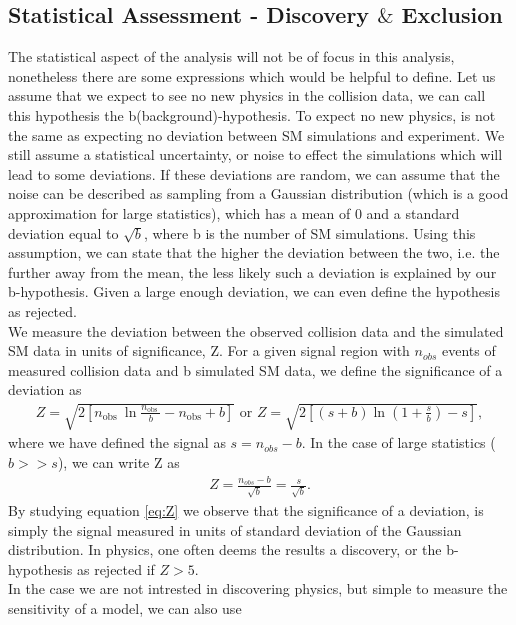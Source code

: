 \subsection{Statistical Assessment - Discovery $\&$ Exclusion}\label{subsec:Sensitivity}
The statistical aspect of the analysis will not be of focus in this analysis, nonetheless there are 
some expressions which would be helpful to define. Let us assume that we expect to see no new physics in the collision
data, we can call this hypothesis the b(background)-hypothesis. To expect no new physics, is not the same as expecting no 
deviation between \ac{SM} simulations and experiment. We still assume a statistical uncertainty, or noise to effect the simulations which 
will lead to some deviations. If these deviations are random, we can assume that the noise can be described as sampling from a Gaussian distribution 
(which is a good approximation for large statistics), which has a mean of 0 and a standard deviation equal to $\sqrt{b}$, where b is 
the number of \ac{SM} simulations. Using this assumption, we can state that the higher the deviation between the two, i.e. the further away 
from the mean, the less likely such a deviation is explained by our b-hypothesis. Given a large enough deviation, we can even 
define the hypothesis as rejected.
\\
We measure the deviation between the observed collision data and the simulated \ac{SM} data in units of significance, Z. 
For a given signal region with $n_{obs}$ events of measured collision data and b simulated \ac{SM} data, we define
the significance of a deviation as
\begin{align}\label{eq:Z1}
Z=\sqrt{2\left[n_{\text {obs }} \ln \frac{n_{\text {obs }}}{b}-n_{\mathrm{obs}}+b\right]} \text { or } 
Z=\sqrt{2\left[(s+b) \ln \left(1+\frac{s}{b}\right)-s\right]}, 
\end{align}
where we have defined the signal as $s = n_{obs} - b$. In the case of large statistics ($b>>s$), we can write Z 
as 
\begin{align}\label{eq:Z}
    Z=\frac{n_{o b s}-b}{\sqrt{b}} = \frac{s}{\sqrt{b}}.
\end{align}
By studying equation \ref{eq:Z} we observe that the significance of a deviation, is simply the signal measured in units of standard
deviation of the Gaussian distribution. In physics, one often deems the results a discovery, or the b-hypothesis as rejected if $Z>5$. 
\\
In the case we are not intrested in discovering physics, but simple to measure the sensitivity of a model, we can also use 
